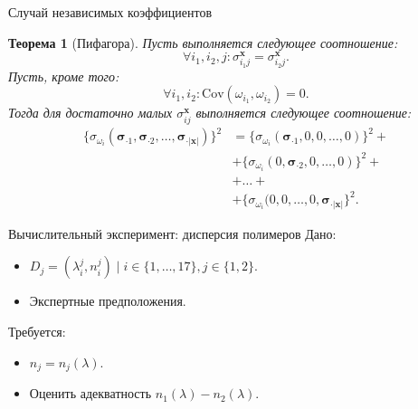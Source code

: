 \documentclass{beamer}
\newtheorem{theo}{Теорема}
\begin{document}
\begin{frame}{Случай независимых коэффициентов}
  \begin{theo}[Пифагора]
    Пусть выполняется следующее соотношение:
    \[
      \forall i_1, i_2, j: \sigma_{i_1 j}^{\mathbf{x}} = \sigma_{i_2 j}^{\mathbf{x}}.
    \]
    Пусть, кроме того:
    \[
      \forall i_1, i_2: \text{Cov} (\omega_{i_1}, \omega_{i_2}) = 0.
    \]
    Тогда для
    достаточно малых $\sigma_{ij}^\mathbf{x}$ выполняется следующее соотношение:
    \begin{align*}
      \{ \sigma_{\omega_i} (\boldsymbol{\sigma}_{\cdot 1}, \boldsymbol{\sigma}_{\cdot 2}, \dots, \boldsymbol{\sigma}_{\cdot |\mathbf{x}|}) \}^2 &=
        \{ \sigma_{\omega_i} (\boldsymbol{\sigma}_{\cdot 1}, 0, 0, \dots, 0) \}^2 + \nonumber \\
        & + \{ \sigma_{\omega_i} (0, \boldsymbol{\sigma}_{\cdot 2}, 0, \dots, 0) \}^2 + \nonumber \\
        & + \dots + \nonumber \\
        & + \{ \sigma_{\omega_i} (0, 0, \dots, 0, \boldsymbol{\sigma}_{\cdot |\mathbf{x}|} \}^2.
      \label{eq:pypha_variance}
    \end{align*}
  \end{theo}
\end{frame}

\begin{frame}{Вычислительный эксперимент: дисперсия полимеров}
  Дано:
  \begin{itemize}
    \item $D_j = (\lambda_i^j, n_i^j) \mid i \in \{ 1, \dots, 17 \}, j \in \{ 1, 2 \}.$
    \item Экспертные предположения.
  \end{itemize}
  
  Требуется:
  \begin{itemize}
    \item $n_j = n_j(\lambda).$
    \item Оценить адекватность $n_1 (\lambda) - n_2 (\lambda)$.
  \end{itemize}
\end{frame}
\end{document}
